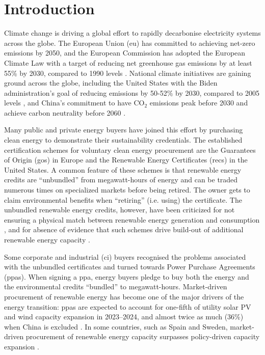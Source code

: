 \documentclass[11pt, 5p, nopreprintline]{elsarticle}
\begin{document}
\tableofcontents

\section{Introduction}
\label{sec:intro}


Climate change is driving a global effort to rapidly decarbonise electricity systems across the globe.
The European Union (\gls{eu}) has committed to achieving net-zero emissions by 2050, and the European Commission has adopted the European Climate Law with a target of reducing net greenhouse gas emissions by at least 55\% by 2030, compared to 1990 levels \cite{EuropeanClimateLaw2020}.
National climate initiatives are gaining ground across the globe, including the United States with the Biden administration's goal of reducing emissions by 50-52\% by 2030, compared to 2005 levels \cite{BidenClimatePlan2021}, and China's commitment to have CO$_2$ emissions peak before 2030 and achieve carbon neutrality before 2060 \cite{ChinaNetZero-IEA, liuEconomicCostEnergy2023}.


Many public and private energy buyers have joined this effort by purchasing clean energy to demonstrate their sustainability credentials.
The established certification schemes for voluntary clean energy procurement are the Guarantees of Origin (\gls{go}s) in Europe and the Renewable Energy Certificates (\gls{rec}s) in the United States.
A common feature of these schemes is that renewable energy credits are \enquote{unbundled} from megawatt-hours of energy and can be traded numerous times on specialized markets before being retired.
The owner gets to claim environmental benefits when \enquote{retiring} (i.e. using) the certificate.
The unbundled renewable energy credits, however, have been criticized for not ensuring a physical match between renewable energy generation and consumption \cite{spglobal-recs, bock-icelandGOproblem, re100report-2020}, and for absence of evidence that such schemes drive build-out of additional renewable energy capacity \cite{bjorn-RECSnatcom-2022, gillenwater-2014}.

Some corporate and industrial (\gls{ci}) buyers recognised the problems associated with the unbundled certificates and turned towards Power Purchase Agreements (\gls{ppa}s).
When signing a \gls{ppa}, energy buyers pledge to buy both the energy and the environmental credits \enquote{bundled} to megawatt-hours.
Market-driven procurement of renewable energy has become one of the major drivers of the energy transition: \gls{ppa}s are expected to account for one-fifth of utility solar PV and wind capacity expansion in 2023--2024, and almost twice as much (36\%) when China is excluded \cite{iea-REppa2023}.
In some countries, such as Spain and Sweden, market-driven procurement of renewable energy capacity surpasses policy-driven capacity expansion \cite{iea-REppa2023}.
\end{document}
